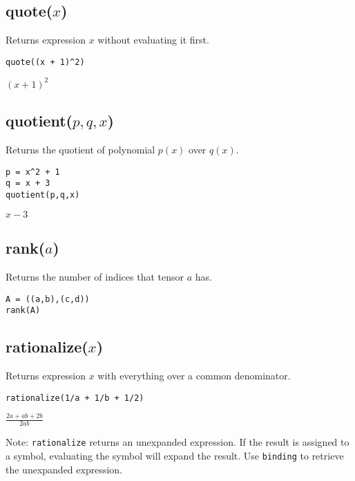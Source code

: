 \subsection*{quote($x$)}

Returns expression $x$ without evaluating it first.

{\color{blue}
\begin{verbatim}
quote((x + 1)^2)
\end{verbatim}
}

\noindent
$\displaystyle (x+1)^2$

\subsection*{quotient($p,q,x$)}

Returns the quotient of polynomial $p(x)$ over $q(x)$.

{\color{blue}
\begin{verbatim}
p = x^2 + 1
q = x + 3
quotient(p,q,x)
\end{verbatim}
}

\noindent
$x-3$

\subsection*{rank($a$)}

Returns the number of indices that tensor $a$ has.

{\color{blue}
\begin{verbatim}
A = ((a,b),(c,d))
rank(A)
\end{verbatim}
}


\subsection*{rationalize($x$)}

Returns expression $x$ with everything over a common denominator.

{\color{blue}
\begin{verbatim}
rationalize(1/a + 1/b + 1/2)
\end{verbatim}
}

\noindent
$\displaystyle \frac{2a+ab+2b}{2ab}$

\bigskip
\noindent
Note:
\verb$rationalize$
returns an unexpanded expression.
If the result is assigned to a symbol, evaluating the symbol will expand the result.
Use
\verb$binding$
to retrieve the unexpanded expression.

